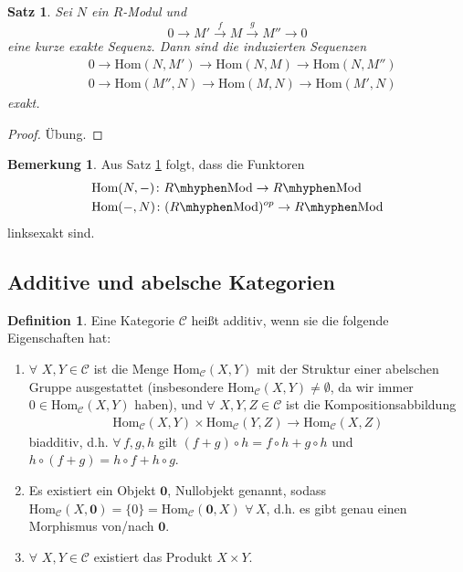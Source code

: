 \documentclass[reqno,12pt]{article}
\numberwithin{equation}{section}
\newcommand{\cC}{\mathcal{C}}
\newcommand{\Hom}{\text{Hom}}
\theoremstyle{plain}
\newtheorem{proposition}[thm]{Satz}
\theoremstyle{definition}
\newtheorem{definition}[thm]{Definition}
\newtheorem{remark}[thm]{Bemerkung}
\newcommand{\blank}{{-}}
\newcommand{\Mod}{\text{Mod}}
\begin{document}
\begin{proposition}\label{prop.: hom-is-left-exact}
Sei $N$ ein $R$-Modul und
$$
0 \to M' \overset{f}{\to} M \overset{g}{\to} M'' \to 0
$$
eine kurze exakte Sequenz. Dann sind die induzierten Sequenzen
\begin{align*}
&  0 \to \Hom(N,M') \to \Hom(N,M) \to \Hom(N,M'') \\
&  0 \to \Hom(M'', N) \to \Hom(M,N) \to \Hom(M',N)
\end{align*}
exakt.
\end{proposition}

\begin{proof}
Übung.
\end{proof}


\begin{remark}
Aus Satz \ref{prop.: hom-is-left-exact} folgt, dass die Funktoren
\begin{align*}
& \Hom(N,\blank)  \colon R \mhyphen \Mod \to R \mhyphen \Mod \\
& \Hom(\blank, N)  \colon (R \mhyphen \Mod)^{op} \to R \mhyphen \Mod
\end{align*}
linksexakt sind.
\end{remark}


\subsection{Additive und abelsche Kategorien}

\begin{definition}
Eine Kategorie $\cC$ heißt {\sf additiv}, wenn sie die folgende Eigenschaften hat:
\begin{enumerate}
  \item $\forall$ $X,Y \in \cC$ ist die Menge $\Hom_{\cC}(X,Y)$ mit der Struktur einer abelschen Gruppe ausgestattet (insbesondere $\Hom_{\cC}(X,Y) \neq \emptyset$, da wir immer $0 \in \Hom_{\cC}(X,Y)$ haben), und $\forall$ $X,Y,Z \in \cC$ ist die Kompositionsabbildung
  \begin{align*}
  \Hom_{\cC}(X,Y) \times \Hom_{\cC}(Y,Z) \to \Hom_{\cC}(X,Z)
  \end{align*}
  {\sf biadditiv}, d.h. $\forall \,  f,g,h$ gilt $(f+g) \circ h  = f \circ h + g \circ h$ und $h \circ (f+g) = h \circ f + h \circ g$.

  \item Es existiert ein Objekt $\textbf{0}$, Nullobjekt genannt, sodass $\Hom_{\cC}(X,\textbf{0}) = \{0\} = \Hom_{\cC}(\textbf{0},X)$ $\forall\, X$, d.h. es gibt genau einen Morphismus von/nach $\textbf{0}$.

  \item $\forall$ $X,Y \in \cC$ existiert das Produkt $X \times Y$.
\end{enumerate}
\end{definition}
\end{document}
